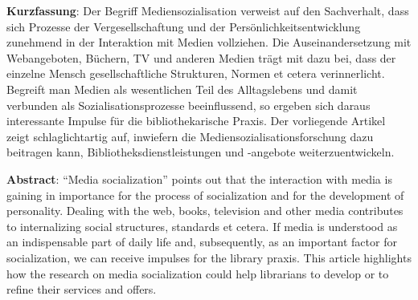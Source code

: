 \textbf{Kurzfassung}: Der Begriff Mediensozialisation verweist auf den
Sachverhalt, dass sich Prozesse der Vergesellschaftung und der
Persönlichkeitsentwicklung zunehmend in der Interaktion mit Medien
vollziehen. Die Auseinandersetzung mit Webangeboten, Büchern, TV und
anderen Medien trägt mit dazu bei, dass der einzelne Mensch
gesellschaftliche Strukturen, Normen et cetera verinnerlicht. Begreift
man Medien als wesentlichen Teil des Alltagslebens und damit verbunden
als Sozialisationsprozesse beeinflussend, so ergeben sich daraus
interessante Impulse für die bibliothekarische Praxis. Der vorliegende
Artikel zeigt schlaglichtartig auf, inwiefern die
Mediensozialisationsforschung dazu beitragen kann,
Bibliotheksdienstleistungen und -angebote weiterzuentwickeln.

\textbf{Abstract}: \enquote{Media socialization} points out that the
interaction with media is gaining in importance for the process of
socialization and for the development of personality. Dealing with the
web, books, television and other media contributes to internalizing
social structures, standards et cetera. If media is understood as an
indispensable part of daily life and, subsequently, as an important
factor for socialization, we can receive impulses for the library
praxis. This article highlights how the research on media socialization
could help librarians to develop or to refine their services and offers.
